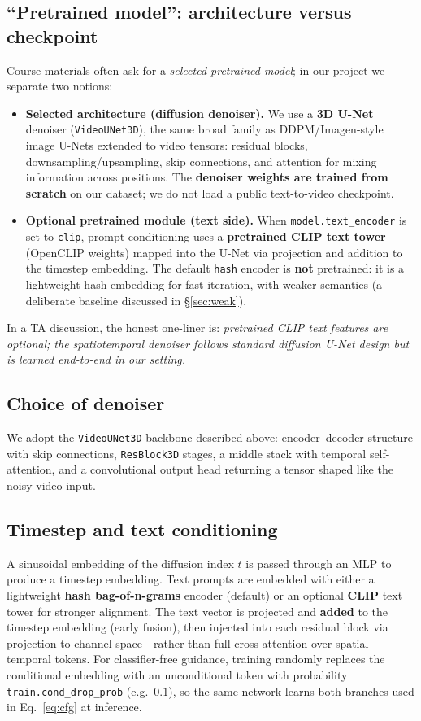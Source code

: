 \documentclass[11pt,a4paper]{article}
\begin{document}
\subsection{``Pretrained model'': architecture versus checkpoint}
Course materials often ask for a \emph{selected pretrained model}; in our project we separate two notions:
\begin{itemize}
  \item \textbf{Selected architecture (diffusion denoiser).} We use a \textbf{3D U-Net} denoiser (\texttt{VideoUNet3D}), the same broad family as DDPM/Imagen-style image U-Nets extended to video tensors: residual blocks, downsampling/upsampling, skip connections, and attention for mixing information across positions.
  The \textbf{denoiser weights are trained from scratch} on our dataset; we do not load a public text-to-video checkpoint.
  \item \textbf{Optional pretrained module (text side).} When \texttt{model.text\_encoder} is set to \texttt{clip}, prompt conditioning uses a \textbf{pretrained CLIP text tower} (OpenCLIP weights) mapped into the U-Net via projection and addition to the timestep embedding.
  The default \texttt{hash} encoder is \textbf{not} pretrained: it is a lightweight hash embedding for fast iteration, with weaker semantics (a deliberate baseline discussed in \S\ref{sec:weak}).
\end{itemize}
In a TA discussion, the honest one-liner is: \emph{pretrained CLIP text features are optional; the spatiotemporal denoiser follows standard diffusion U-Net design but is learned end-to-end in our setting.}

\subsection{Choice of denoiser}
We adopt the \texttt{VideoUNet3D} backbone described above: encoder--decoder structure with skip connections, \texttt{ResBlock3D} stages, a middle stack with temporal self-attention, and a convolutional output head returning a tensor shaped like the noisy video input.

\subsection{Timestep and text conditioning}
A sinusoidal embedding of the diffusion index $t$ is passed through an MLP to produce a timestep embedding.
Text prompts are embedded with either a lightweight \textbf{hash bag-of-n-grams} encoder (default) or an optional \textbf{CLIP} text tower for stronger alignment.
The text vector is projected and \textbf{added} to the timestep embedding (early fusion), then injected into each residual block via projection to channel space---rather than full cross-attention over spatial--temporal tokens.
For classifier-free guidance, training randomly replaces the conditional embedding with an unconditional token with probability \texttt{train.cond\_drop\_prob} (e.g.\ $0.1$), so the same network learns both branches used in Eq.~\eqref{eq:cfg} at inference.
\end{document}
